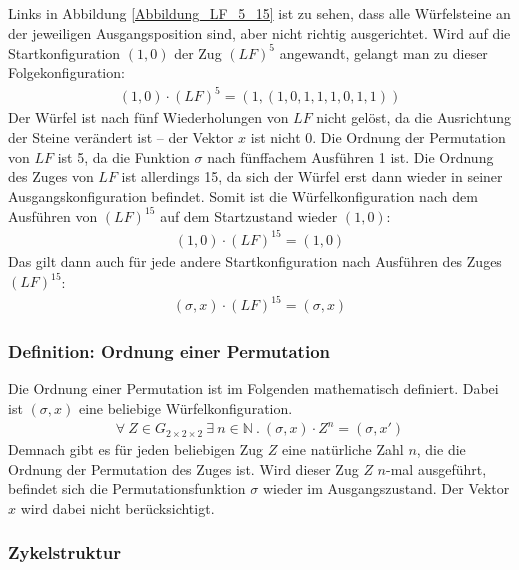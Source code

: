 \documentclass[12pt,a4paper, usenames, dvipsnames]{article}
\theoremstyle{mystyle}
\theoremstyle{definition}
\newcommand{\Gtwo}{\ensuremath{G_{2\times 2\times 2}}}
\begin{document}
Links in Abbildung \ref{Abbildung_LF_5_15} ist zu sehen, dass alle Würfelsteine an der jeweiligen Ausgangsposition sind, aber nicht richtig ausgerichtet. Wird auf die Startkonfiguration $(1,0)$ der Zug $(LF)^5$ angewandt, gelangt man zu dieser Folgekonfiguration:
\begin{align*}
(1,0) \cdot (LF)^5 = (1, (1,0,1,1,1,0,1,1))
\end{align*}
Der Würfel ist nach fünf Wiederholungen von $LF$ nicht gelöst, da die Ausrichtung der Steine verändert ist -- der Vektor $x$ ist nicht 0. Die Ordnung der Permutation von $LF$ ist 5, da die Funktion $\sigma$ nach fünffachem Ausführen 1 ist. Die Ordnung des Zuges von $LF$ ist allerdings 15, da sich der Würfel erst dann wieder in seiner Ausgangskonfiguration befindet. Somit ist die Würfelkonfiguration nach dem Ausführen von $(LF)^{15}$ auf dem Startzustand wieder $(1,0)$:
\begin{align*}
(1,0) \cdot (LF)^{15} = (1,0)
\end{align*}
Das gilt dann auch für jede andere Startkonfiguration nach Ausführen des Zuges $(LF)^{15}$:
\begin{align*}
(\sigma, x) \cdot (LF)^{15} = (\sigma, x)
\end{align*}

\subsubsection*{Definition: Ordnung einer Permutation}

Die Ordnung einer Permutation ist im Folgenden mathematisch definiert. Dabei ist $(\sigma, x)$ eine beliebige Würfelkonfiguration.
\begin{align*}
\forall \ Z \in \Gtwo \ \exists \ n \in \mathbb{N} \ . \ (\sigma, x) \cdot Z^n = (\sigma, x')
\end{align*}
Demnach gibt es für jeden beliebigen Zug $Z$ eine natürliche Zahl $n$, die die Ordnung der Permutation des Zuges ist. Wird dieser Zug $Z$ $n$-mal ausgeführt, befindet sich die Permutationsfunktion $\sigma$ wieder im Ausgangszustand. Der Vektor $x$ wird dabei nicht berücksichtigt.




\subsubsection*{Zykelstruktur}



\label{Abschnitt_Zykelstruktur}
\end{document}
